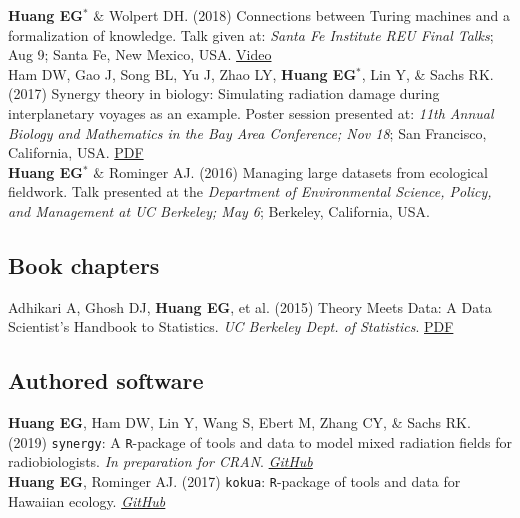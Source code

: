 \documentclass[10pt, letterpaper]{article}
\newcommand{\years}[1]{\marginnote{\scriptsize #1}}
\begin{document}
\years{2018}\textbf{Huang EG}$^{*}$ $ \& $ Wolpert DH. (2018) Connections between Turing machines and a formalization of knowledge. Talk given at: \emph{Santa Fe Institute REU Final Talks}; Aug 9; Santa Fe, New Mexico, USA. \href{https://www.youtube.com/watch?v=10bi_R47uYw&list=PLZlVBTf7N6GpTwEeQOlOmIfYN5J7zciZR&index=6&t=0s}{Video}\\

\years{2017}Ham DW, Gao J, Song BL, Yu J, Zhao LY, \textbf{Huang EG}$^{*}$, Lin Y, \& Sachs RK. (2017) Synergy theory in biology: Simulating radiation damage during interplanetary voyages as an example. Poster session presented at: \emph{11th Annual Biology and Mathematics in the Bay Area Conference; Nov 18}; San Francisco, California, USA. \href{https://nbviewer.jupyter.org/github/sachsURAP/BaMBA_11/blob/master/Bamba17v3.pdf}{PDF}\\

\years{2016}\textbf{Huang EG}$^* $ $ \& $ Rominger AJ. (2016) Managing large datasets from ecological fieldwork. Talk presented at the \emph{Department of Environmental Science, Policy, and Management at UC Berkeley; May 6}; Berkeley, California, USA.

\newpage
\subsection*{Book chapters}
\noindent

\years{2015}Adhikari A, Ghosh DJ, \textbf{Huang EG}, et al. (2015) Theory Meets Data: A Data Scientist’s Handbook to Statistics. \emph{UC Berkeley Dept. of Statistics}. {\href{https://nbviewer.jupyter.org/github/eghuang/theory_meets_data/blob/master/theory-meets-data.pdf}{PDF}}\\

\subsection*{Authored software}
\noindent

\years{2019}\textbf{Huang EG}, Ham DW, Lin Y, Wang S, Ebert M, Zhang CY, \& Sachs RK. (2019) \lstinline{synergy}: A \lstinline{R}-package of tools and data to model mixed radiation fields for radiobiologists. \emph{In preparation for CRAN}. \emph{\href{https://github.com/sachsURAP/NASAmouseHG}{GitHub}}\\

\years{2017}\textbf{Huang EG}, Rominger AJ. (2017) \lstinline{kokua}: \lstinline{R}-package of tools and data for Hawaiian ecology. \emph{\href{https://github.com/hawaiiDimensions/kokua}{GitHub}}\\
\end{document}
